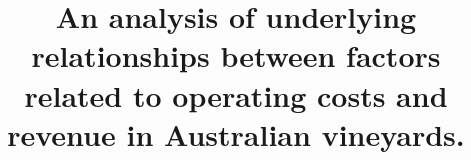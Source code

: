 \documentclass[review,12pt,authoryear]{elsarticle}
\begin{document}
\begin{linenumbers}
\begin{frontmatter}



\title{An analysis of underlying relationships between factors related to operating costs and revenue in Australian vineyards.}



% 




\end{frontmatter}
\end{linenumbers}
\end{document}
